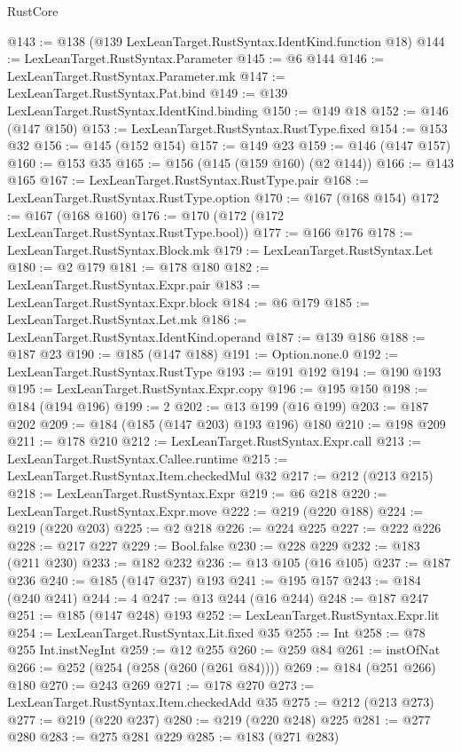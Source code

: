 \begin{lexlean}{RustCore}
\begin{coremodule}
{\begin{coremodule}
{{{{{@143 := @138 (@139 LexLeanTarget.RustSyntax.IdentKind.function @18)
@144 := LexLeanTarget.RustSyntax.Parameter
@145 := @6 @144
@146 := LexLeanTarget.RustSyntax.Parameter.mk
@147 := LexLeanTarget.RustSyntax.Pat.bind
@149 := @139 LexLeanTarget.RustSyntax.IdentKind.binding
@150 := @149 @18
@152 := @146 (@147 @150)
@153 := LexLeanTarget.RustSyntax.RustType.fixed
@154 := @153 @32
@156 := @145 (@152 @154)
@157 := @149 @23
@159 := @146 (@147 @157)
@160 := @153 @35
@165 := @156 (@145 (@159 @160) (@2 @144))
@166 := @143 @165
@167 := LexLeanTarget.RustSyntax.RustType.pair
@168 := LexLeanTarget.RustSyntax.RustType.option
@170 := @167 (@168 @154)
@172 := @167 (@168 @160)
@176 := @170 (@172 (@172 LexLeanTarget.RustSyntax.RustType.bool))
@177 := @166 @176
@178 := LexLeanTarget.RustSyntax.Block.mk
@179 := LexLeanTarget.RustSyntax.Let
@180 := @2 @179
@181 := @178 @180
@182 := LexLeanTarget.RustSyntax.Expr.pair
@183 := LexLeanTarget.RustSyntax.Expr.block
@184 := @6 @179
@185 := LexLeanTarget.RustSyntax.Let.mk
@186 := LexLeanTarget.RustSyntax.IdentKind.operand
@187 := @139 @186
@188 := @187 @23
@190 := @185 (@147 @188)
@191 := Option.none.{0}
@192 := LexLeanTarget.RustSyntax.RustType
@193 := @191 @192
@194 := @190 @193
@195 := LexLeanTarget.RustSyntax.Expr.copy
@196 := @195 @150
@198 := @184 (@194 @196)
@199 := 2
@202 := @13 @199 (@16 @199)
@203 := @187 @202
@209 := @184 (@185 (@147 @203) @193 @196) @180
@210 := @198 @209
@211 := @178 @210
@212 := LexLeanTarget.RustSyntax.Expr.call
@213 := LexLeanTarget.RustSyntax.Callee.runtime
@215 := LexLeanTarget.RustSyntax.Item.checkedMul @32
@217 := @212 (@213 @215)
@218 := LexLeanTarget.RustSyntax.Expr
@219 := @6 @218
@220 := LexLeanTarget.RustSyntax.Expr.move
@222 := @219 (@220 @188)
@224 := @219 (@220 @203)
@225 := @2 @218
@226 := @224 @225
@227 := @222 @226
@228 := @217 @227
@229 := Bool.false
@230 := @228 @229
@232 := @183 (@211 @230)
@233 := @182 @232
@236 := @13 @105 (@16 @105)
@237 := @187 @236
@240 := @185 (@147 @237) @193
@241 := @195 @157
@243 := @184 (@240 @241)
@244 := 4
@247 := @13 @244 (@16 @244)
@248 := @187 @247
@251 := @185 (@147 @248) @193
@252 := LexLeanTarget.RustSyntax.Expr.lit
@254 := LexLeanTarget.RustSyntax.Lit.fixed @35
@255 := Int
@258 := @78 @255 Int.instNegInt
@259 := @12 @255
@260 := @259 @84
@261 := instOfNat
@266 := @252 (@254 (@258 (@260 (@261 @84))))
@269 := @184 (@251 @266) @180
@270 := @243 @269
@271 := @178 @270
@273 := LexLeanTarget.RustSyntax.Item.checkedAdd @35
@275 := @212 (@213 @273)
@277 := @219 (@220 @237)
@280 := @219 (@220 @248) @225
@281 := @277 @280
@283 := @275 @281 @229
@285 := @183 (@271 @283)
}}}}}
\end{coremodule}}
\end{coremodule}
\end{lexlean}
